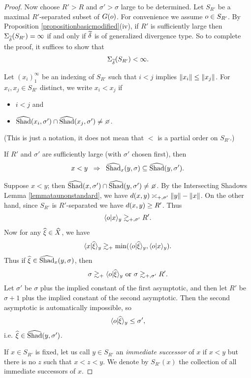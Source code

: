 \begin{proof}
Now choose $R' > R$ and $\sigma' > \sigma$ large to be determined. Let $S_{R'}$ be a maximal $R'$-separated subset of $G(o)$. For convenience we assume $o\in S_{R'}$. By Proposition \ref{propositionbasicmodified}(iv), if $R'$ is sufficiently large then $\Sigma_{\widetilde\delta}(S_{R'}) = \infty$ if and only if $\widetilde\delta$ is of generalized divergence type. So to complete the proof, it suffices to show that
\[
\Sigma_{\widetilde\delta}(S_{R'}) < \infty.
\]
\begin{notation}
\label{notationpartialorder}
Let $(x_i)_1^\infty$ be an indexing of $S_{R'}$ such that $i < j$ implies $\|x_i\| \leq \|x_j\|$. For $x_i,x_j\in S_{R'}$ distinct, we write $x_i < x_j$ if
\begin{itemize}
\item [(I)] $i < j$ and
\item [(II)] $\what\Shad(x_i,\sigma')\cap\what\Shad(x_j,\sigma')\neq\emptyset$.
\end{itemize}
(This is just a notation, it does not mean that $<$ is a partial order on $S_{R'}$.)
\end{notation}
\begin{lemma}
\label{lemmaahlforsdisjoint}
If $R'$ and $\sigma'$ are sufficiently large (with $\sigma'$ chosen first), then
\[
x < y \;\;\Rightarrow\;\; \widehat{\operatorname{Shad}}_x(y,\sigma) \subseteq \widehat{\operatorname{Shad}}(y,\sigma').
\]
\end{lemma}
\begin{subproof}
Suppose $x < y$; then $\what\Shad(x,\sigma')\cap\what\Shad(y,\sigma')\neq\emptyset$. By the Intersecting Shadows Lemma \ref{lemmataunonstandard}, we have $d(x,y) \asymp_{+,\sigma'} \|y\| - \|x\|$. On the other hand, since $S_{R'}$ is $R'$-separated we have $d(x,y) \geq R'$. Thus
\[
\langle o|x\rangle_y \gtrsim_{+,\sigma'} R'.
\]
Now for any $\xihat\in\what X$, we have
\[
\lb x|\xihat\rb_y \gtrsim_\plus \min(\lb \zero|\xihat\rb_y,\lb \zero|x\rb_y).
\]
Thus if $\xihat\in\what\Shad_x(y,\sigma)$, then
\[
\sigma \gtrsim_\plus \lb \zero|\xihat\rb_y \text{ or } \sigma \gtrsim_{\plus,\sigma'} R'.
\]
Let $\sigma'$ be $\sigma$ plus the implied constant of the first asymptotic, and then let $R'$ be $\sigma + 1$ plus the implied constant of the second asymptotic. Then the second asymptotic is automatically impossible, so
\[
\lb \zero|\xihat\rb_y \leq \sigma',
\]
i.e. $\xihat\in\what\Shad(y,\sigma')$.
\end{subproof}
If $x\in S_{R'}$ is fixed, let us call $y\in S_{R'}$ an \emph{immediate successor} of $x$ if $x < y$ but there is no $z$ such that $x < z < y$. We denote by $S_{R'}(x)$ the collection of all immediate successors of $x$.


\end{proof}
